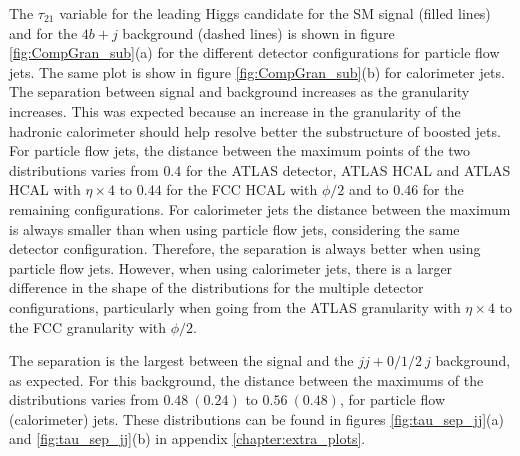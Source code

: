 The $\tau_{21}$ variable for the leading Higgs candidate for the SM signal (filled lines) and for the $4b+j$ background (dashed lines) is shown in figure \ref{fig:CompGran_sub}(a) for the different detector configurations for particle flow jets. The same plot is show in figure \ref{fig:CompGran_sub}(b) for calorimeter jets. The separation between signal and background increases as the granularity increases. This was expected because an increase in the granularity of the hadronic calorimeter should help resolve better the substructure of boosted jets. For particle flow jets, the distance between the maximum points of the two distributions varies from $0.4$ for the ATLAS detector, ATLAS HCAL and ATLAS HCAL with $\eta\times 4$ to $0.44$ for the FCC HCAL with $\phi/2$ and to $0.46$ for the remaining configurations. For calorimeter jets the distance between the maximum is always smaller than when using particle flow jets, considering the same detector configuration. Therefore, the separation is always better when using particle flow jets. However, when using calorimeter jets, there is a larger difference in the shape of the distributions for the multiple detector configurations, particularly when going from the ATLAS granularity with $\eta\times 4$ to the FCC granularity with $\phi/2$. 

The separation is the largest between the signal and the $jj+0/1/2~j$ background, as expected. For this background, the distance between the maximums of the distributions varies from $0.48~(0.24)$ to $0.56 ~(0.48)$, for particle flow (calorimeter) jets. These distributions can be found in figures \ref{fig:tau_sep_jj}(a) and \ref{fig:tau_sep_jj}(b) in appendix \ref{chapter:extra_plots}.


